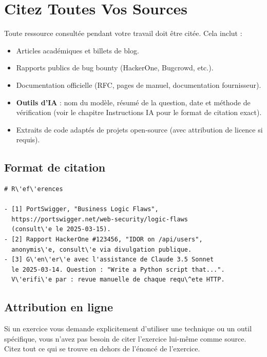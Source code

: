 \section{Citez Toutes Vos Sources}
\label{sec:cite-sources}

Toute ressource consult\'ee pendant votre travail doit \^etre cit\'ee.
Cela inclut :

\begin{itemize}
  \item Articles acad\'emiques et billets de blog.
  \item Rapports publics de bug bounty (HackerOne, Bugcrowd, etc.).
  \item Documentation officielle (RFC, pages de manuel, documentation
        fournisseur).
  \item \textbf{Outils d'IA} : nom du mod\`ele, r\'esum\'e de la
        question, date et m\'ethode de v\'erification (voir le chapitre
        Instructions IA pour le format de citation exact).
  \item Extraits de code adapt\'es de projets open-source (avec
        attribution de licence si requis).
\end{itemize}

\subsection*{Format de citation}

\begin{verbatim}
# R\'ef\'erences

- [1] PortSwigger, "Business Logic Flaws",
  https://portswigger.net/web-security/logic-flaws
  (consult\'e le 2025-03-15).
- [2] Rapport HackerOne #123456, "IDOR on /api/users",
  anonymis\'e, consult\'e via divulgation publique.
- [3] G\'en\'er\'e avec l'assistance de Claude 3.5 Sonnet
  le 2025-03-14. Question : "Write a Python script that...".
  V\'erifi\'e par : revue manuelle de chaque requ\^ete HTTP.
\end{verbatim}

\subsection*{Attribution en ligne}

Si un exercice vous demande explicitement d'utiliser une technique ou
un outil sp\'ecifique, vous n'avez pas besoin de citer l'exercice
lui-m\^eme comme source. Citez tout ce qui se trouve en dehors de
l'\'enonc\'e de l'exercice.
